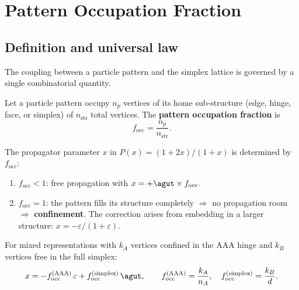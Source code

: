 
\section{Pattern Occupation Fraction}
\label{ch:occupation_fraction}

\subsection{Definition and universal law}

The coupling between a particle pattern and the simplex lattice is governed by a single combinatorial quantity.

\begin{definition}
\label{def:f_occ_main}
Let a particle pattern occupy $n_p$ vertices of its home sub-structure (edge, hinge, face, or simplex) of $n_\mathrm{str}$ total vertices.  The \textbf{pattern occupation fraction} is
\begin{equation}
\boxed{f_\mathrm{occ} = \frac{n_p}{n_\mathrm{str}}.}
\end{equation}
\end{definition}

\begin{theorem}
\label{thm:f_occ_main}
The propagator parameter $x$ in $P(x) = (1+2x)/(1+x)$ is determined by $f_\mathrm{occ}$:
\begin{enumerate}
\item $f_\mathrm{occ} < 1$: free propagation with $x = +\agut \times f_\mathrm{occ}$.
\item $f_\mathrm{occ} = 1$: the pattern fills its structure completely $\Rightarrow$ no propagation room $\Rightarrow$ \textbf{confinement}.  The correction arises from embedding in a larger structure: $x = -\varepsilon/(1+\varepsilon)$.
\end{enumerate}
For mixed representations with $k_A$ vertices confined in the AAA hinge and $k_B$ vertices free in the full simplex:
\begin{equation}
x = -f_\mathrm{occ}^\mathrm{(AAA)}\,\varepsilon + f_\mathrm{occ}^\mathrm{(simplex)}\,\agut, \qquad f_\mathrm{occ}^\mathrm{(AAA)} = \frac{k_A}{n_A}, \quad f_\mathrm{occ}^\mathrm{(simplex)} = \frac{k_B}{d}.
\end{equation}
\end{theorem}

